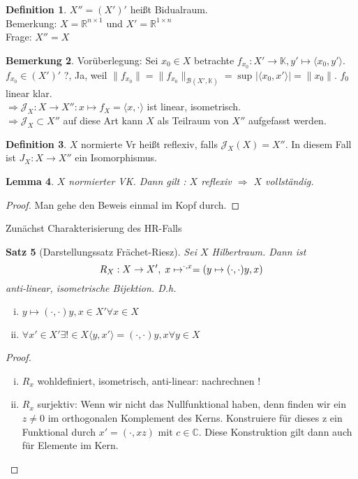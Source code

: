 \documentclass[ngerman]{report}
\theoremstyle{plain}%
\newtheorem{thm}{Satz}[chapter]
\newtheorem{lemma}[thm]{Lemma}
\theoremstyle{definition}%
\newtheorem{definition}[thm]{Definition}
\theoremstyle{myStyle}
\newtheorem{bem}[thm]{Bemerkung}
\newcommand{\C}{\mathbb{C}}
\newcommand{\R}{\mathbb{R}}
\newcommand{\K}{\mathbb{K}}
\newcommand{\B}{\mathcal{B}} %
\newcommand{\norm}[1]{\|#1\|}
\newcommand{\df}[1][]{%
	\overset{#1}{\Rightarrow}
}
\newcommand{\SP}{(\cdot,\cdot)}
\newcommand{\fop}[1]{\langle #1 \rangle}
\begin{document}
		\begin{definition}
			$X'' = (X')' $ heißt Bidualraum. \\
			Bemerkung: $X = \R^{n\times 1}$ und $X' = \R^{1 \times n}$ \\
			Frage: $X'' = X$	
		\end{definition}

		\begin{bem}
		Vorüberlegung: Sei $x_0 \in X$ betrachte $f_{x_0}: X' \to \K, y' \mapsto \langle x_0, y' \rangle$. 
		$f_{x_0} \in (X')'$ ?, Ja, weil $\norm{f_{x_0}} = \norm{f_{x_0}}_{\B(X',\K)} = \sup_{}|\langle  x_0, x' \rangle| = \norm{x_0}$. $f_0$ linear klar. \\
		$\df \mathcal{J}_{X}: X \to X'': x \mapsto f_X = \langle x, \cdot \rangle$ ist linear, isometrisch. \\ 
		$\df \mathcal{J}_X \subset X''$ auf diese Art kann $X$ als Teilraum von $X''$ aufgefasst werden.
		\end{bem}

	\begin{definition}
		$X$ normierte Vr heißt reflexiv, falls $\mathcal{J}_X(X) = X''$. In diesem Fall ist $J_X :X \to X''$ ein Isomorphismus.
	\end{definition}

	\begin{lemma}
		$X$ normierter VK. Dann gilt : $X$ reflexiv $\df$ $X$ vollständig.
	\end{lemma}

	\begin{proof}
		Man gehe den Beweis einmal im Kopf durch.	
	\end{proof}

	Zunächst Charakterisierung des HR-Falls
	
	\begin{thm}[Darstellungssatz Frächet-Riesz]
		Sei $X$ Hilbertraum. Dann ist 
			$$R_X : X \to X', \; x \mapsto \sp{\cdot, x} = (y \mapsto \SP{y,x})$$
			anti-linear, isometrische Bijektion. D.h.
						\begin{enumerate}[(i)]
							\item $y \mapsto \SP{y,x} \in X' \forall x\in X$
							\item $\forall x' \in X' \exists ! \in X \fop{y,x'} = \SP{y,x} \forall y \in X$
						\end{enumerate}
	\end{thm}

	\begin{proof}
			\begin{enumerate}[(i)]
				\item $R_x$ wohldefiniert, isometrisch, anti-linear: nachrechnen !
				\item $R_x$ surjektiv: Wenn wir nicht das Nullfunktional haben, denn finden wir ein $z \neq 0$ im orthogonalen Komplement des Kerns. Konstruiere für dieses z ein Funktional durch $x' = (\cdot, x z)$ mit $c \in \C$. Diese Konstruktion gilt dann auch für Elemente im Kern.
			\end{enumerate}

	\end{proof}
\end{document}
